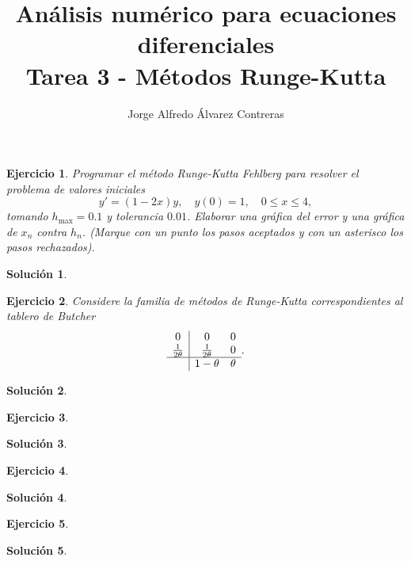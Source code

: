 \documentclass[11pt]{article}
\title{Análisis numérico para ecuaciones diferenciales \\
Tarea 3 - Métodos Runge-Kutta}
\author{Jorge Alfredo Álvarez Contreras}
\newtheorem{exercise}{Ejercicio}
\newtheorem*{sol}{Solución}
\begin{document}
\maketitle

\begin{exercise}
   Programar el método Runge-Kutta Fehlberg para resolver el problema
   de valores iniciales
   \begin{equation}
     y'
     =
     (1-2x)y,
     \quad y(0)=1,
     \quad 0\leq x\leq 4
   ,\end{equation}
   tomando $h_\mathrm{max}=0.1$ y tolerancia $0.01$. Elaborar una
   gráfica del error y una gráfica de $x_n$ contra $h_n$. (Marque con
   un punto los pasos aceptados y con un asterisco los pasos
   rechazados).
\end{exercise}
\begin{sol}
\end{sol}

\begin{exercise}
  Considere la familia de métodos de Runge-Kutta correspondientes al
  table\-ro de Butcher
  \begin{equation}
    \begin{array}{c|cc}
      0 & 0 & 0 \\
      \frac{1}{2\theta} & \frac{1}{2\theta} & 0 \\
      \hline
                        & 1-\theta & \theta
    \end{array}
  .\end{equation}
\end{exercise}
\begin{sol}
\end{sol}

\begin{exercise}
\end{exercise}
\begin{sol}
\end{sol}

\begin{exercise}
\end{exercise}
\begin{sol}
\end{sol}

\begin{exercise}
\end{exercise}
\begin{sol}
\end{sol}
\end{document}
